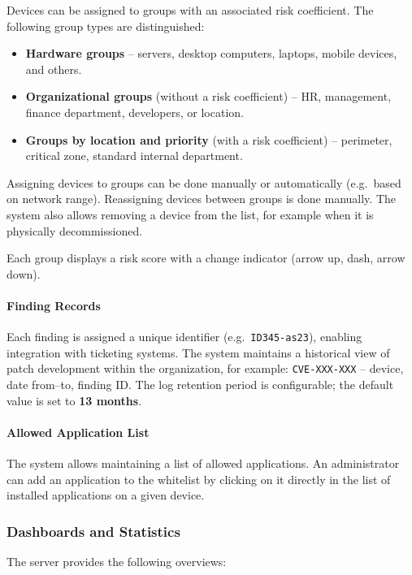 Devices can be assigned to groups with an associated risk coefficient.
The following group types are distinguished:

\begin{itemize}
    \item \textbf{Hardware groups} -- servers, desktop computers, laptops, mobile devices, and others.
    \item \textbf{Organizational groups} (without a risk coefficient) -- HR, management, finance department, developers, or location.
    \item \textbf{Groups by location and priority} (with a risk coefficient) -- perimeter, critical zone, standard internal department.
\end{itemize}

Assigning devices to groups can be done manually or automatically (e.g.\ based on network range).
Reassigning devices between groups is done manually.
The system also allows removing a device from the list, for example when it is physically decommissioned.

Each group displays a risk score with a change indicator (arrow up, dash, arrow down).

\paragraph{Finding Records}

Each finding is assigned a unique identifier (e.g.\ \texttt{ID345-as23}), enabling integration with ticketing systems.
The system maintains a historical view of patch development within the organization, for example: \texttt{CVE-XXX-XXX} -- device, date from--to, finding ID.
The log retention period is configurable; the default value is set to \textbf{13 months}.

\paragraph{Allowed Application List}

The system allows maintaining a list of allowed applications. An administrator can add an application to the whitelist by clicking on it directly in the list of installed applications on a given device.

\subsubsection{Dashboards and Statistics}

The server provides the following overviews:


